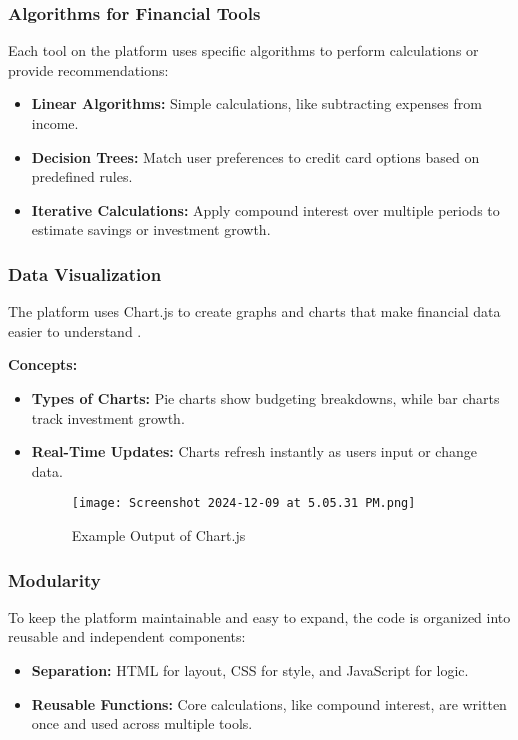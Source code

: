 \documentclass[11pt,twocolumn]{article}
\begin{document}
\subsubsection{Algorithms for Financial Tools}
Each tool on the platform uses specific algorithms to perform calculations or provide recommendations:
\begin{itemize}
    \item \textbf{Linear Algorithms:} Simple calculations, like subtracting expenses from income.
    \item \textbf{Decision Trees:} Match user preferences to credit card options based on predefined rules.
    \item \textbf{Iterative Calculations:} Apply compound interest over multiple periods to estimate savings or investment growth.
\end{itemize}

\subsubsection{Data Visualization}
The platform uses Chart.js to create graphs and charts that make financial data easier to understand \cite{chartjs}. 

\textbf{Concepts:}
\begin{itemize}
    \item \textbf{Types of Charts:} Pie charts show budgeting breakdowns, while bar charts track investment growth.
    \item \textbf{Real-Time Updates:} Charts refresh instantly as users input or change data.
    \begin{figure}[!h]
    \centering
    \texttt{[image: Screenshot 2024-12-09 at 5.05.31 PM.png]}
    \caption{Example Output of Chart.js}
    \label{fig:enter-label}
\end{figure}
\end{itemize}



\subsubsection{Modularity}
To keep the platform maintainable and easy to expand, the code is organized into reusable and independent components:
\begin{itemize}
    \item \textbf{Separation:} HTML for layout, CSS for style, and JavaScript for logic.
    \item \textbf{Reusable Functions:} Core calculations, like compound interest, are written once and used across multiple tools.
\end{itemize}
\end{document}
